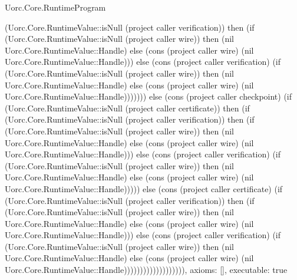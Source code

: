\begin{lexlean}{Uorc.Core.RuntimeProgram}
\begin{semanticmodule}
{(Uorc.Core.RuntimeValue::isNull (project caller verification)) then (if (Uorc.Core.RuntimeValue::isNull (project caller wire)) then (nil Uorc.Core.RuntimeValue::Handle) else (cons (project caller wire) (nil Uorc.Core.RuntimeValue::Handle))) else (cons (project caller verification) (if (Uorc.Core.RuntimeValue::isNull (project caller wire)) then (nil Uorc.Core.RuntimeValue::Handle) else (cons (project caller wire) (nil Uorc.Core.RuntimeValue::Handle))))))) else (cons (project caller checkpoint) (if (Uorc.Core.RuntimeValue::isNull (project caller certificate)) then (if (Uorc.Core.RuntimeValue::isNull (project caller verification)) then (if (Uorc.Core.RuntimeValue::isNull (project caller wire)) then (nil Uorc.Core.RuntimeValue::Handle) else (cons (project caller wire) (nil Uorc.Core.RuntimeValue::Handle))) else (cons (project caller verification) (if (Uorc.Core.RuntimeValue::isNull (project caller wire)) then (nil Uorc.Core.RuntimeValue::Handle) else (cons (project caller wire) (nil Uorc.Core.RuntimeValue::Handle))))) else (cons (project caller certificate) (if (Uorc.Core.RuntimeValue::isNull (project caller verification)) then (if (Uorc.Core.RuntimeValue::isNull (project caller wire)) then (nil Uorc.Core.RuntimeValue::Handle) else (cons (project caller wire) (nil Uorc.Core.RuntimeValue::Handle))) else (cons (project caller verification) (if (Uorc.Core.RuntimeValue::isNull (project caller wire)) then (nil Uorc.Core.RuntimeValue::Handle) else (cons (project caller wire) (nil Uorc.Core.RuntimeValue::Handle))))))))))))))))))),
  axioms: [],
  executable: true
}


\end{semanticmodule}
\end{lexlean}
